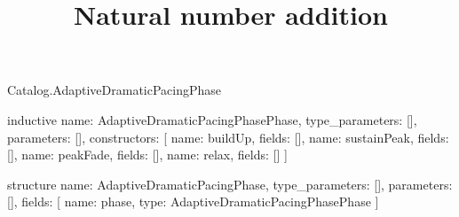 \begin{lexlean}{Catalog.AdaptiveDramaticPacingPhase}
\title{Natural number addition}
\begin{semanticmodule}
inductive{
  name: AdaptiveDramaticPacingPhasePhase,
  type_parameters: [],
  parameters: [],
  constructors: [
    {name: buildUp, fields: []},
    {name: sustainPeak, fields: []},
    {name: peakFade, fields: []},
    {name: relax, fields: []}
  ]
}

structure{
  name: AdaptiveDramaticPacingPhase,
  type_parameters: [],
  parameters: [],
  fields: [
    {name: phase, type: AdaptiveDramaticPacingPhasePhase}
  ]
}
\end{semanticmodule}
\end{lexlean}
